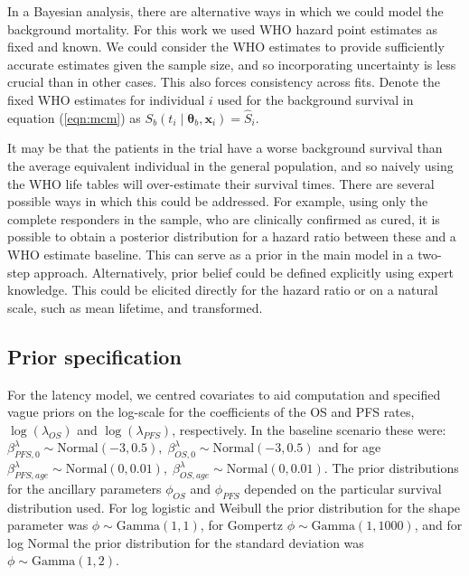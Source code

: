 \documentclass[AMA,STIX1COL]{WileyNJD-v2}
\begin{document}
In a Bayesian analysis, there are alternative ways in which we could model the background mortality.
For this work we used WHO hazard point estimates as fixed and known.
We could consider the WHO estimates to provide sufficiently accurate estimates given the sample size, and so incorporating uncertainty is less crucial than in other cases. This also forces consistency across fits.
Denote the fixed WHO estimates for individual $i$ used for the background survival in equation (\ref{eqn:mcm}) as $S_b(t_i \mid \bm\theta_b, \bm{x}_i) = \hat{S}_i$.

It may be that the patients in the trial have a worse background survival than the average equivalent individual in the general population, and so naively using the WHO life tables will over-estimate their survival times.
There are several possible ways in which this could be addressed.
For example, using only the complete responders in the sample, who are clinically confirmed as cured, it is possible to obtain a posterior distribution for a hazard ratio between these and a WHO estimate baseline.
This can serve as a prior in the main model in a two-step approach. Alternatively, prior belief could be defined explicitly using expert knowledge.
This could be elicited directly for the hazard ratio or on a natural scale, such as mean lifetime, and transformed.

%
\subsection{Prior specification}
For the latency model, we centred covariates to aid computation and specified vague priors on the log-scale for the coefficients of the OS and PFS rates, $\log(\lambda_{OS})$ and $\log(\lambda_{PFS})$, respectively. 
In the baseline scenario these were: ${\beta_{PFS,0}^{\lambda} \sim \text{Normal}(-3, 0.5),}\; {\beta_{OS,0}^{\lambda} \sim \text{Normal}(-3, 0.5)}$ and for age $\beta_{PFS,age}^{\lambda} \sim \text{Normal}(0, 0.01),\; \beta_{OS,age}^{\lambda} \sim \text{Normal}(0, 0.01)$.
The prior distributions for the ancillary parameters $\phi_{OS}$ and $\phi_{PFS}$ depended on the particular survival distribution used. For log logistic and Weibull the prior distribution for the shape parameter was $\phi \sim \text{Gamma}(1,1)$, for Gompertz $\phi \sim \text{Gamma}(1,1000)$, and for log Normal the prior distribution for the standard deviation was $\phi \sim \text{Gamma}(1,2)$.
\end{document}
